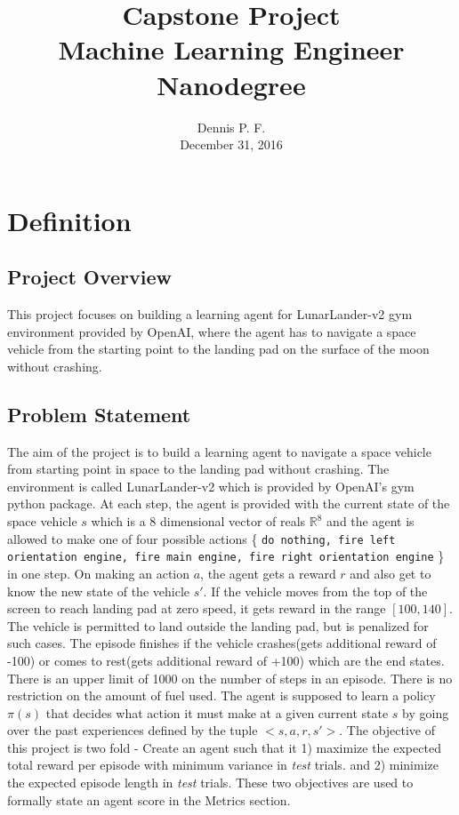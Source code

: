 \documentclass{svproc}
\begin{document}
\mainmatter
\title{Capstone Project \\ {\large Machine Learning Engineer Nanodegree}}
\author{Dennis P. F. \\ {\small December 31, 2016}}
\institute{}
\maketitle
\pagestyle{empty}
\section{Definition}
\subsection*{Project Overview}
This project focuses on building a learning agent for LunarLander-v2 gym environment provided by OpenAI\cite{challenge}, where the agent has to navigate a space vehicle from the starting point to the landing pad on the surface of the moon without crashing.
\subsection*{Problem Statement}
The aim of the project is to build a learning agent to navigate a space vehicle from starting point in space to the landing pad without crashing. The environment is called LunarLander-v2 which is provided by OpenAI's gym python package. At each step, the agent is provided with the current state of the space vehicle $s$ which is a 8 dimensional vector of reals $\mathbb{R}^8$ and the agent is allowed to make one of four possible actions \{ \texttt{do nothing, fire left orientation engine, fire main engine, fire right orientation engine} \} in one step. On making an action $a$, the agent gets a reward $r$ and also get to know the new state of the vehicle $s'$. If the vehicle moves from the top of the screen to reach landing pad at zero speed, it gets reward in the range $[100, 140]$. The vehicle is permitted to land outside the landing pad, but is penalized for such cases. The episode finishes if the vehicle crashes(gets additional reward of -100) or comes to rest(gets additional reward of +100) which are the end states. There is an upper limit of 1000 on the number of steps in an episode. There is no restriction on the amount of fuel used. The agent is supposed to learn a policy $\pi(s)$ that decides what action it must make at a given current state $s$ by going over the past experiences defined by the tuple $<s, a, r, s'>$.  The objective of this project is two fold - Create an agent such that it 1) maximize the expected total reward per episode with minimum variance in \textit{test} trials. and 2) minimize the expected episode length in \textit{test} trials. These two objectives are used to formally state an agent score in the Metrics section.
\end{document}
